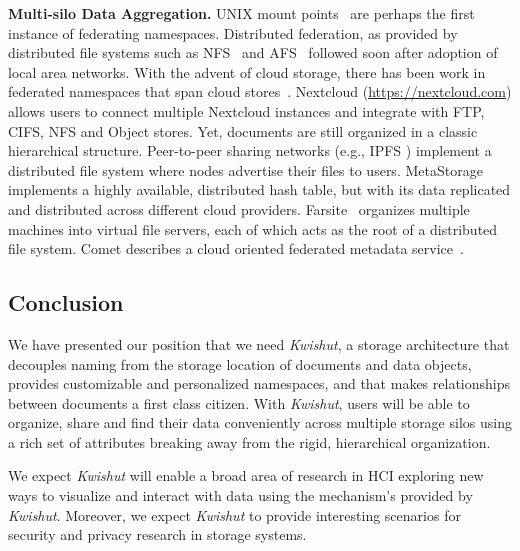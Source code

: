 \noindent\textbf{Multi-silo Data Aggregation.}
UNIX mount points~\cite{unix} are perhaps the first instance of federating namespaces.
Distributed federation, as provided by distributed file systems such as NFS~\cite{nfs} and AFS~\cite{howard1988scale} followed soon after adoption of local area networks.
With the advent of cloud storage, there has been work in federated namespaces that span
cloud stores~\cite{scfs,federatedMetaData}.
Nextcloud (\url{https://nextcloud.com}) allows users to connect multiple Nextcloud instances and integrate with
FTP, CIFS, NFS and Object stores. Yet, documents are still organized in a classic
hierarchical structure. Peer-to-peer sharing networks (e.g., IPFS \cite{benet2014ipfs}) implement a distributed
file system where nodes advertise their files to users.
MetaStorage~\cite{metastorage} implements a highly available, distributed hash table,
but with
its data replicated and distributed across different cloud providers.
Farsite~\cite{Adya:2003:Farsite} organizes multiple machines into virtual file servers, each of which acts as the root of a distributed file system. Comet describes a cloud oriented federated metadata service~\cite{federatedMetaData}.

\subsection{Conclusion}
\label{hotstorage:conclusion}

We have presented our position that we need \emph{Kwishut}, a storage
architecture that decouples naming from the storage location of documents and
data objects, provides customizable and personalized namespaces, and that makes
relationships between documents a first class citizen. With \emph{Kwishut},
users will be able to organize, share and find their data conveniently across
multiple storage silos using a rich set of attributes breaking away from the
rigid, hierarchical organization.

We expect \emph{Kwishut} will enable a broad area of research in HCI exploring
new ways to visualize and interact with data using the mechanism's provided by
\emph{Kwishut}. Moreover, we expect \emph{Kwishut} to provide interesting
scenarios for security and privacy research in storage systems.

